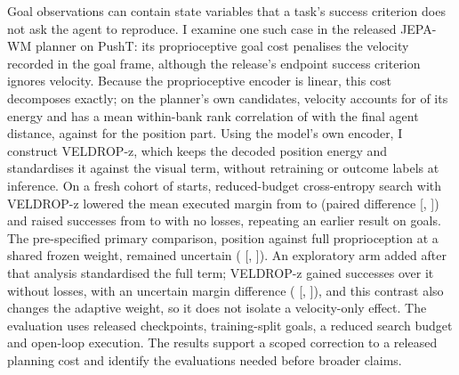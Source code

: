 Goal observations can contain state variables that a task's success criterion does not ask the agent to reproduce. I
examine one such case in the released JEPA-WM planner on PushT: its proprioceptive goal cost penalises the velocity
recorded in the goal frame, although the release's endpoint success criterion ignores velocity. Because the proprioceptive
encoder is linear, this cost decomposes exactly; on the planner's own candidates, velocity accounts for \DecJVel{} of its energy and has a
mean within-bank rank correlation of \DecJSpVel{} with the final agent distance, against \DecJSpPos{} for the position
part. Using the model's own encoder, I construct VELDROP-z, which keeps the decoded position energy and standardises it
against the visual term, without retraining or outcome labels at inference. On a fresh cohort of \RTwN{} starts,
reduced-budget cross-entropy search with VELDROP-z lowered the mean executed margin from \RTwRawMargin{} to
\RTwVZMargin{} (paired difference \RTwQTwoD{} [\RTwQTwoLo, \RTwQTwoHi]) and raised successes from \RTwRawSucc{} to
\RTwVZSucc{} with no losses, repeating an earlier result on \RNineN{} goals. The pre-specified primary comparison,
position against full proprioception at a shared frozen weight, remained uncertain (\RTwQOneD{} [\RTwQOneLo,
\RTwQOneHi]). An exploratory arm added after that analysis standardised the full term; \mbox{VELDROP-z} gained \RThGain{}
successes over it without losses, with an uncertain margin difference (\RThD{} [\RThLo, \RThHi]), and this contrast
also changes the adaptive weight, so it does not isolate a velocity-only effect. The evaluation uses released
checkpoints, training-split goals, a reduced search budget and open-loop execution. The results support a scoped
correction to a released planning cost and identify the evaluations needed before broader claims.
